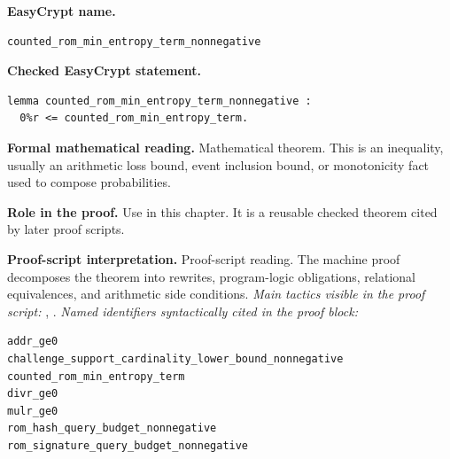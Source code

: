 \begin{formaltheorem}
\noindent\textbf{EasyCrypt name.}
\begin{lstlisting}[language=EasyCrypt,basicstyle=\ttfamily\scriptsize]
counted_rom_min_entropy_term_nonnegative
\end{lstlisting}
\noindent\textbf{Checked EasyCrypt statement.}
\begin{lstlisting}[language=EasyCrypt,basicstyle=\ttfamily\scriptsize]
lemma counted_rom_min_entropy_term_nonnegative :
  0%r <= counted_rom_min_entropy_term.
\end{lstlisting}
\noindent\textbf{Formal mathematical reading.}
Mathematical theorem. This is an inequality, usually an arithmetic loss bound, event inclusion bound, or monotonicity fact used to compose probabilities.

\noindent\textbf{Role in the proof.}
Use in this chapter. It is a reusable checked theorem cited by later proof scripts.

\noindent\textbf{Proof-script interpretation.}
Proof-script reading. The machine proof decomposes the theorem into rewrites, program-logic obligations, relational equivalences, and arithmetic side conditions.
\emph{Main tactics visible in the proof script:} , .
\emph{Named identifiers syntactically cited in the proof block:}
\begin{lstlisting}[language=EasyCrypt,basicstyle=\ttfamily\scriptsize]
addr_ge0
challenge_support_cardinality_lower_bound_nonnegative
counted_rom_min_entropy_term
divr_ge0
mulr_ge0
rom_hash_query_budget_nonnegative
rom_signature_query_budget_nonnegative
\end{lstlisting}

\end{formaltheorem}

